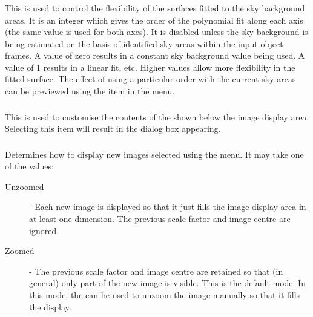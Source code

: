 \subsubsection {} This is used to control
the flexibility of the surfaces fitted to the sky background areas. It is
an integer which gives the order of the polynomial fit along each axis
(the same value is used for both axes). It is disabled unless the sky
background is being estimated on the basis of identified sky areas within
the input object frames. A value of zero results in a constant sky
background value being used. A value of 1 results in a linear fit, etc.
Higher values allow more flexibility in the fitted surface. The effect of
using a particular order with the current sky areas can be previewed
using the 
 item in the 
 menu.

\subsubsection {} This is used to
customise the contents of the 
shown below the image display area. Selecting this item will result in the 
 dialog
box appearing.

\subsubsection {} Determines how to display new
images selected using the 
menu. It may take one of the values:

\begin{description}

\item [Unzoomed] - Each new image is displayed so that it just fills the 
image display area in at least one dimension. The previous scale factor
and image centre are ignored.

\item [Zoomed] - The previous scale factor and image centre are retained
so that (in general) only part of the new image is visible. This is the
default mode. In this mode, the  can
be used to unzoom the image manually so that it fills the display.

\end{description}

